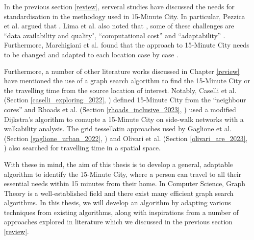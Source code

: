In the previous section \ref{review}, serveral studies have discussed the needs for standardisation in the methodogy used in 15-Minute City. In particular, Pezzica et al. argued that  \cite{Pezzica_Altafini_Mara_Chioni_2024}. Lima et al. also noted that , some of these challenges are ``data availability and quality", ``computational cost'' and ``adaptability'' \cite{lima_quest_2023}. Furthermore, Marchigiani et al. found that the approach to 15-Minute City needs to be changed and adapted to each location case by case \cite{marchigiani_urban_2022}.

Furthermore, a number of other literature works discussed in Chapter \ref{review} have mentioned the use of a graph search algorithm to find the 15-Minute City or the travelling time from the source location of interest. Notably, Caselli et al. (Section \ref{caselli_exploring_2022}, \cite{caselli_exploring_2022}) defined 15-Minute City from the ``neighbour cores'' and Rhoads et al. (Section \ref{rhoads_inclusive_2023}, \cite{rhoads_inclusive_2023}) used a modified Dijkstra's algorithm to comupte a 15-Minute City on side-walk networks with a walkability analysis. The grid tessellatin approaches used by Gaglione et al. (Section \ref{gaglione_urban_2022}, \cite{gaglione_urban_2022}) and Olivari et al. (Section \ref{olivari_are_2023}, \cite{olivari_are_2023}) also searched for travelling time in a spatial space.

With these in mind, the aim of this thesis is to develop a general, adaptable algorithm to identify the 15-Minute City, where a person can travel to all their essential needs within 15 minutes from their home. In Computer Science, Graph Theory is a well-established field and there exist many efficient graph search algorithms. In this thesis, we will develop an algorithm by adapting various techniques from existing algorithms, along with inspirations from a number of approaches explored in literature which we discussed in the previous section \ref{review}.

